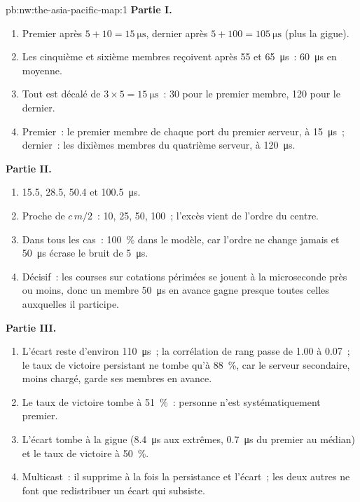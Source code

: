 \begin{solution}{pb:nw:the-asia-pacific-map:1}
\textbf{Partie I.}
\begin{enumerate}
\item Premier après $5 + 10 = \qty{15}{\micro\second}$, dernier après $5 + 100 = \qty{105}{\micro\second}$ (plus la gigue).
\item Les cinquième et sixième membres reçoivent après 55 et \qty{65}{\micro\second}~: \qty{60}{\micro\second} en moyenne.
\item Tout est décalé de $3 \times 5 = \qty{15}{\micro\second}$~: 30 pour le premier membre, 120 pour le dernier.
\item Premier~: le premier membre de chaque port du premier serveur, à \qty{15}{\micro\second}~; dernier~: les dixièmes membres du quatrième serveur, à
  \qty{120}{\micro\second}.
\end{enumerate}
\textbf{Partie II.}
\begin{enumerate}[resume]
\item 15.5, 28.5, 50.4 et \qty{100.5}{\micro\second}.
\item Proche de $c\,m/2$~: 10, 25, 50, 100~; l'excès vient de l'ordre du centre.
\item Dans tous les cas~: 100~\% dans le modèle, car l'ordre ne change jamais et \qty{50}{\micro\second} écrase le bruit de
  \qty{5}{\micro\second}.
\item Décisif~: les courses sur cotations périmées se jouent à la microseconde près ou moins, donc un membre \qty{50}{\micro\second} en avance gagne presque toutes celles
  auxquelles il participe.
\end{enumerate}
\textbf{Partie III.}
\begin{enumerate}[resume]
\item L'écart reste d'environ \qty{110}{\micro\second}~; la corrélation de rang passe de 1.00 à 0.07~; le taux de victoire persistant ne tombe qu'à 88~\%,
  car le serveur secondaire, moins chargé, garde ses membres en avance.
\item Le taux de victoire tombe à 51~\%~: personne n'est systématiquement premier.
\item L'écart tombe à la gigue (\qty{8.4}{\micro\second} aux extrêmes, \qty{0.7}{\micro\second} du premier au médian) et le taux de
  victoire à 50~\%.
\item Multicast~: il supprime à la fois la persistance et l'écart~; les deux autres ne font que redistribuer un écart qui subsiste.
\end{enumerate}

\end{solution}
